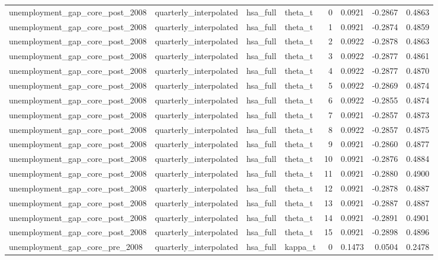 \begin{tabular}{llllrrrr}
unemployment\_gap\_core\_post\_2008 & quarterly\_interpolated & hsa\_full & theta\_t & 0 & 0.0921 & -0.2867 & 0.4863 \\
unemployment\_gap\_core\_post\_2008 & quarterly\_interpolated & hsa\_full & theta\_t & 1 & 0.0921 & -0.2874 & 0.4859 \\
unemployment\_gap\_core\_post\_2008 & quarterly\_interpolated & hsa\_full & theta\_t & 2 & 0.0922 & -0.2878 & 0.4863 \\
unemployment\_gap\_core\_post\_2008 & quarterly\_interpolated & hsa\_full & theta\_t & 3 & 0.0922 & -0.2877 & 0.4861 \\
unemployment\_gap\_core\_post\_2008 & quarterly\_interpolated & hsa\_full & theta\_t & 4 & 0.0922 & -0.2877 & 0.4870 \\
unemployment\_gap\_core\_post\_2008 & quarterly\_interpolated & hsa\_full & theta\_t & 5 & 0.0922 & -0.2869 & 0.4874 \\
unemployment\_gap\_core\_post\_2008 & quarterly\_interpolated & hsa\_full & theta\_t & 6 & 0.0922 & -0.2855 & 0.4874 \\
unemployment\_gap\_core\_post\_2008 & quarterly\_interpolated & hsa\_full & theta\_t & 7 & 0.0921 & -0.2857 & 0.4873 \\
unemployment\_gap\_core\_post\_2008 & quarterly\_interpolated & hsa\_full & theta\_t & 8 & 0.0922 & -0.2857 & 0.4875 \\
unemployment\_gap\_core\_post\_2008 & quarterly\_interpolated & hsa\_full & theta\_t & 9 & 0.0921 & -0.2860 & 0.4877 \\
unemployment\_gap\_core\_post\_2008 & quarterly\_interpolated & hsa\_full & theta\_t & 10 & 0.0921 & -0.2876 & 0.4884 \\
unemployment\_gap\_core\_post\_2008 & quarterly\_interpolated & hsa\_full & theta\_t & 11 & 0.0921 & -0.2880 & 0.4900 \\
unemployment\_gap\_core\_post\_2008 & quarterly\_interpolated & hsa\_full & theta\_t & 12 & 0.0921 & -0.2878 & 0.4887 \\
unemployment\_gap\_core\_post\_2008 & quarterly\_interpolated & hsa\_full & theta\_t & 13 & 0.0921 & -0.2887 & 0.4887 \\
unemployment\_gap\_core\_post\_2008 & quarterly\_interpolated & hsa\_full & theta\_t & 14 & 0.0921 & -0.2891 & 0.4901 \\
unemployment\_gap\_core\_post\_2008 & quarterly\_interpolated & hsa\_full & theta\_t & 15 & 0.0921 & -0.2898 & 0.4896 \\
unemployment\_gap\_core\_pre\_2008 & quarterly\_interpolated & hsa\_full & kappa\_t & 0 & 0.1473 & 0.0504 & 0.2478 \\

\end{tabular}

